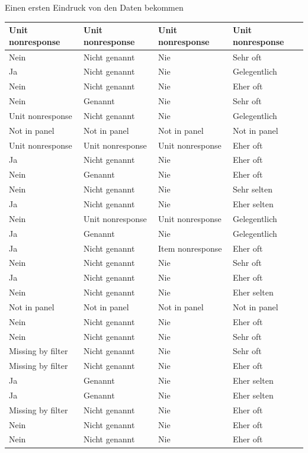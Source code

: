 \documentclass[ignorenonframetext,]{beamer}
\begin{document}
\begin{frame}{Einen ersten Eindruck von den Daten bekommen}
\begin{tabular}{l|l|l|l}
\hline
Unit nonresponse & Unit nonresponse & Unit nonresponse & Unit nonresponse\\
\hline
Nein & Nicht genannt & Nie & Sehr oft\\
\hline
Ja & Nicht genannt & Nie & Gelegentlich\\
\hline
Nein & Nicht genannt & Nie & Eher oft\\
\hline
Nein & Genannt & Nie & Sehr oft\\
\hline
Unit nonresponse & Nicht genannt & Nie & Gelegentlich\\
\hline
Not in panel & Not in panel & Not in panel & Not in panel\\
\hline
Unit nonresponse & Unit nonresponse & Unit nonresponse & Eher oft\\
\hline
Ja & Nicht genannt & Nie & Eher oft\\
\hline
Nein & Genannt & Nie & Eher oft\\
\hline
Nein & Nicht genannt & Nie & Sehr selten\\
\hline
Ja & Nicht genannt & Nie & Eher selten\\
\hline
Nein & Unit nonresponse & Unit nonresponse & Gelegentlich\\
\hline
Ja & Genannt & Nie & Gelegentlich\\
\hline
Ja & Nicht genannt & Item nonresponse & Eher oft\\
\hline
Nein & Nicht genannt & Nie & Sehr oft\\
\hline
Ja & Nicht genannt & Nie & Eher oft\\
\hline
Nein & Nicht genannt & Nie & Eher selten\\
\hline
Not in panel & Not in panel & Not in panel & Not in panel\\
\hline
Nein & Nicht genannt & Nie & Eher oft\\
\hline
Nein & Nicht genannt & Nie & Sehr oft\\
\hline
Missing by filter & Nicht genannt & Nie & Sehr oft\\
\hline
Missing by filter & Nicht genannt & Nie & Eher oft\\
\hline
Ja & Genannt & Nie & Eher selten\\
\hline
Ja & Genannt & Nie & Eher selten\\
\hline
Missing by filter & Nicht genannt & Nie & Eher oft\\
\hline
Nein & Nicht genannt & Nie & Eher oft\\
\hline
Nein & Nicht genannt & Nie & Eher oft\\

\end{tabular}
\end{frame}
\end{document}
